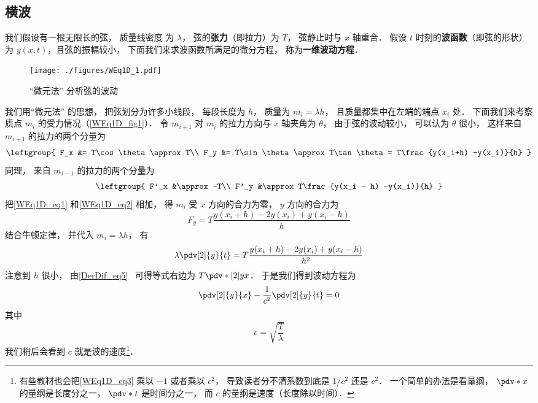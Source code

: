

\subsection{横波}
我们假设有一根无限长的弦， 质量线密度%
为 $\lambda$， 弦的\textbf{张力}（即拉力）为 $T$， 弦静止时与 $x$ 轴重合． 假设 $t$ 时刻的\textbf{波函数}（即弦的形状）为 $y(x, t)$，且弦的振幅较小， 下面我们来求波函数所满足的微分方程， 称为\textbf{一维波动方程}．

\begin{figure}[ht]
\centering
\texttt{[image: ./figures/WEq1D\_1.pdf]}
\caption{“微元法” 分析弦的波动} \label{WEq1D_fig1}
\end{figure}

我们用“微元法” 的思想， 把弦划分为许多小线段， 每段长度为 $h$， 质量为 $m_i = \lambda h$， 且质量都集中在左端的端点 $x_i$ 处． 下面我们来考察质点 $m_i$ 的受力情况（\autoref{WEq1D_fig1}）． 令 $m_{i+1}$ 对 $m_i$ 的拉力方向与 $x$ 轴夹角为 $\theta$， 由于弦的波动较小， 可以认为 $\theta$ 很小， 这样来自 $m_{i+1}$ 的拉力的两个分量为
\begin{equation}\label{WEq1D_eq1}
\leftgroup{
F_x &= T\cos\theta \approx T\\
F_y &= T\sin\theta \approx T\tan\theta = T\frac{y(x_i+h) -y(x_i)}{h}
}\end{equation}
同理， 来自 $m_{i-1}$ 的拉力的两个分量为
\begin{equation}\label{WEq1D_eq2}
\leftgroup{
F'_x &\approx -T\\
F'_y &\approx T\frac{y(x_i - h) -y(x_i)}{h}
}\end{equation}
把\autoref{WEq1D_eq1} 和\autoref{WEq1D_eq2} 相加， 得 $m_i$ 受 $x$ 方向的合力为零， $y$ 方向的合力为
\begin{equation}
F_y = T\frac{y(x_i+h) - 2y(x_i) + y(x_i-h)}{h}
\end{equation}
结合牛顿定律， 并代入 $m_i = \lambda h$， 有
\begin{equation}
\lambda \pdv[2]{y}{t} = T\frac{y(x_i+h) - 2y(x_i) + y(x_i-h)}{h^2}
\end{equation}
注意到 $h$ 很小， 由\autoref{DerDif_eq5}~ 可得等式右边为 $T\pdv*[2]{y}{x}$． 于是我们得到波动方程为
\begin{equation}\label{WEq1D_eq3}
\pdv[2]{y}{x} - \frac{1}{c^2}\pdv[2]{y}{t} = 0
\end{equation}
其中
\begin{equation}
c = \sqrt{\frac{T}{\lambda}}
\end{equation}
我们稍后会看到 $c$ 就是波的速度\footnote{有些教材也会把\autoref{WEq1D_eq3} 乘以 $-1$ 或者乘以 $c^2$， 导致读者分不清系数到底是 $1/c^2$ 还是 $c^2$． 一个简单的办法是看量纲， $\pdv*{x}$ 的量纲是长度分之一， $\pdv*{t}$ 是时间分之一， 而 $c$ 的量纲是速度（长度除以时间）．}．


